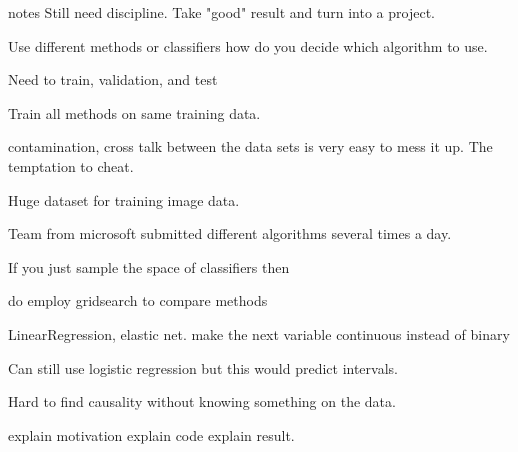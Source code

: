 notes
Still need discipline.
Take "good" result and turn
into a project.

Use different methods or classifiers
how do you decide which algorithm to use.

Need to train, validation, and test

Train all methods on same training data.

contamination, cross talk between the data
sets is very easy to mess it up. The temptation to
cheat.

Huge dataset for training image data.

Team from microsoft submitted different algorithms
several times a day.

If you just sample the space of classifiers
then

do employ gridsearch to compare methods

LinearRegression, elastic net.
make the next variable continuous instead of binary

Can still use logistic regression but this would predict
intervals.

Hard to find causality without knowing something on the data.

explain motivation
explain code
explain result. 